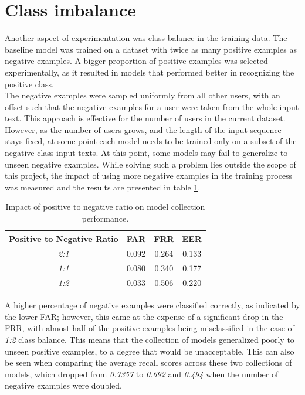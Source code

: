 \section{Class imbalance}
Another aspect of experimentation was class balance in the training data. The baseline model was trained on a dataset with twice as many positive examples as negative examples. A bigger proportion of positive examples was selected experimentally, as it resulted in models that performed better in recognizing the positive class. \\ 
The negative examples were sampled uniformly from all other users, with an offset such that the negative examples for a user were taken from the whole input text. This approach is effective for the number of users in the current dataset. However, as the number of users grows, and the length of the input sequence stays fixed, at some point each model needs to be trained only on a subset of the negative class input texts. At this point, some models may fail to generalize to unseen negative examples. 
While solving such a problem lies outside the scope of this project, the impact of using more negative examples in the training process was measured and the results are presented in table \ref{table:egde_encoding_comp}.


\begin{center}
	\begin{table}[H]
		\begin{center}
			\begin{tabular}{ |c|c|c|c| } 
				\hline
				Positive to Negative Ratio & FAR & FRR & EER \\
				\hline
				\textit{2:1} & 0.092 & 0.264 & 0.133 \\
				\hline
				\textit{1:1} & 0.080 & 0.340 & 0.177 \\
				\hline
				\textit{1:2} & 0.033 & 0.506 & 0.220 \\
				\hline
			\end{tabular}
		\end{center}
		\caption{Impact of positive to negative ratio on model collection performance.}
		\label{table:egde_encoding_comp}
	\end{table}
\end{center}

A higher percentage of negative examples were classified correctly, as indicated by the lower FAR; however, this came at the expense of a significant drop in the FRR, with almost half of the positive examples being misclassified in the case of \textit{1:2} class balance. This means that the collection of models generalized poorly to unseen positive examples, to a degree that would be unacceptable. This can also be seen when comparing the average recall scores across these two collections of models, which dropped from \textit{0.7357} to \textit{0.692} and \textit{0.494} when the number of negative examples were doubled. 


